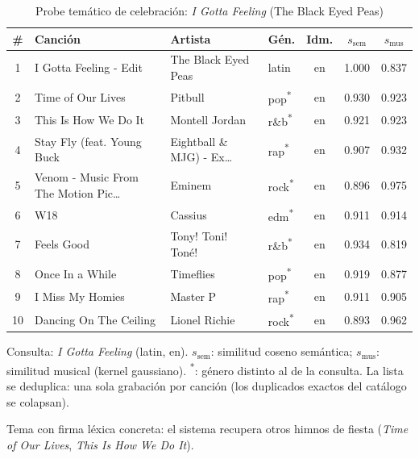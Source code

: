 \begin{table}[htbp]
  \centering
  \begin{threeparttable}
  \caption{Probe temático de celebración: \emph{I Gotta Feeling} (The Black Eyed Peas)}
  \label{tab:qual_probe_celebracion}
  \small
  \setlength{\tabcolsep}{4pt}
  \begin{tabular}{@{}c >{\raggedright\arraybackslash}p{4.0cm} >{\raggedright\arraybackslash}p{2.8cm} l c c c@{}}
    \toprule
    \# & Canción & Artista & Gén. & Idm. & $s_{\text{sem}}$ & $s_{\text{mus}}$ \\
    \midrule
    1 & I Gotta Feeling - Edit & The Black Eyed Peas & latin & en & 1.000 & 0.837 \\
    2 & Time of Our Lives & Pitbull & pop\textsuperscript{*} & en & 0.930 & 0.923 \\
    3 & This Is How We Do It & Montell Jordan & r\&b\textsuperscript{*} & en & 0.921 & 0.923 \\
    4 & Stay Fly (feat. Young Buck & Eightball \& MJG) - Ex\ldots & rap\textsuperscript{*} & en & 0.907 & 0.932 \\
    5 & Venom - Music From The Motion Pic\ldots & Eminem & rock\textsuperscript{*} & en & 0.896 & 0.975 \\
    6 & W18 & Cassius & edm\textsuperscript{*} & en & 0.911 & 0.914 \\
    7 & Feels Good & Tony! Toni! Toné! & r\&b\textsuperscript{*} & en & 0.934 & 0.819 \\
    8 & Once In a While & Timeflies & pop\textsuperscript{*} & en & 0.919 & 0.877 \\
    9 & I Miss My Homies & Master P & rap\textsuperscript{*} & en & 0.911 & 0.905 \\
    10 & Dancing On The Ceiling & Lionel Richie & rock\textsuperscript{*} & en & 0.893 & 0.962 \\
    \bottomrule
  \end{tabular}
  \begin{tablenotes}[flushleft]
    \small
    \item Consulta: \emph{I Gotta Feeling} (latin, en). $s_{\text{sem}}$: similitud coseno semántica; $s_{\text{mus}}$: similitud musical (kernel gaussiano). \textsuperscript{*}: género distinto al de la consulta. La lista se deduplica: una sola grabación por canción (los duplicados exactos del catálogo se colapsan).
    \item Tema con firma léxica concreta: el sistema recupera otros himnos de fiesta (\emph{Time of Our Lives}, \emph{This Is How We Do It}).
  \end{tablenotes}
  \end{threeparttable}
\end{table}